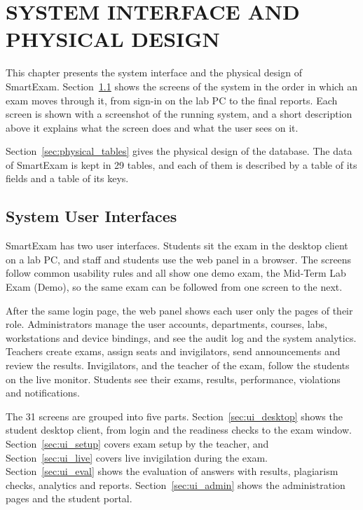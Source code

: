 \chapter{SYSTEM INTERFACE AND PHYSICAL DESIGN}
\label{chap:system_interface_physical_design}

This chapter presents the system interface and the physical design of SmartExam. Section~\ref{sec:system_user_interfaces} shows the screens of the system in the order in which an exam moves through it, from sign-in on the lab PC to the final reports. Each screen is shown with a screenshot of the running system, and a short description above it explains what the screen does and what the user sees on it.

Section~\ref{sec:physical_tables} gives the physical design of the database. The data of SmartExam is kept in 29 tables, and each of them is described by a table of its fields and a table of its keys.

\section{System User Interfaces}
\label{sec:system_user_interfaces}
SmartExam has two user interfaces. Students sit the exam in the desktop client on a lab PC, and staff and students use the web panel in a browser. The screens follow common usability rules \cite{nielsen_heuristics} and all show one demo exam, the Mid-Term Lab Exam (Demo), so the same exam can be followed from one screen to the next.

After the same login page, the web panel shows each user only the pages of their role. Administrators manage the user accounts, departments, courses, labs, workstations and device bindings, and see the audit log and the system analytics. Teachers create exams, assign seats and invigilators, send announcements and review the results. Invigilators, and the teacher of the exam, follow the students on the live monitor. Students see their exams, results, performance, violations and notifications.

The 31 screens are grouped into five parts. Section~\ref{sec:ui_desktop} shows the student desktop client, from login and the readiness checks to the exam window. Section~\ref{sec:ui_setup} covers exam setup by the teacher, and Section~\ref{sec:ui_live} covers live invigilation during the exam. Section~\ref{sec:ui_eval} shows the evaluation of answers with results, plagiarism checks, analytics and reports. Section~\ref{sec:ui_admin} shows the administration pages and the student portal.

